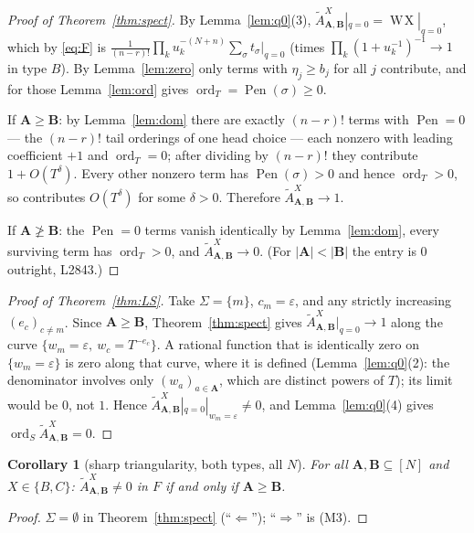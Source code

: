 \documentclass[11pt]{article}
\theoremstyle{plain}
\newtheorem{cor}[thm]{Corollary}
\theoremstyle{definition}
\newcommand{\At}{\widetilde{A}}
\newcommand{\bA}{\mathbf{A}}
\newcommand{\bB}{\mathbf{B}}
\newcommand{\ord}{\operatorname{ord}}
\newcommand{\Pen}{\operatorname{Pen}}
\DeclareMathOperator{\WX}{W\!X}
\begin{document}
\begin{proof}[Proof of Theorem~\ref{thm:spect}]
By Lemma~\ref{lem:q0}(3), $\At^{X}_{\bA,\bB}|_{q=0}=\WX|_{q=0}$, which by
\eqref{eq:F} is $\frac{1}{(n-r)!}\prod_k u_k^{-(N+n)}\sum_\sigma t_\sigma|_{q=0}$
(times $\prod_k(1+u_k^{-1})^{-1}\to1$ in type $B$).  By Lemma~\ref{lem:zero} only
terms with $\eta_j\ge b_j$ for all $j$ contribute, and for those
Lemma~\ref{lem:ord} gives $\ord_T=\Pen(\sigma)\ge0$.

If $\bA\ge\bB$: by Lemma~\ref{lem:dom} there are exactly $(n-r)!$ terms with
$\Pen=0$ --- the $(n-r)!$ tail orderings of one head choice --- each nonzero with
leading coefficient $+1$ and $\ord_T=0$; after dividing by $(n-r)!$ they
contribute $1+O(T^{\delta})$.  Every other nonzero term has $\Pen(\sigma)>0$ and
hence $\ord_T>0$, so contributes $O(T^{\delta})$ for some $\delta>0$.  Therefore
$\At^{X}_{\bA,\bB}\to1$.

If $\bA\not\ge\bB$: the $\Pen=0$ terms vanish identically by
Lemma~\ref{lem:dom}, every surviving term has $\ord_T>0$, and
$\At^{X}_{\bA,\bB}\to0$.  (For $|\bA|<|\bB|$ the entry is $0$ outright, L2843.)
\end{proof}

\begin{proof}[Proof of Theorem~\ref{thm:LS}]
Take $\Sigma=\{m\}$, $c_m=\varepsilon$, and any strictly increasing
$(e_c)_{c\ne m}$.  Since $\bA\ge\bB$, Theorem~\ref{thm:spect} gives
$\At^{X}_{\bA,\bB}|_{q=0}\to1$ along the curve
$\{w_m=\varepsilon,\ w_c=T^{-e_c}\}$.  A rational function that is identically
zero on $\{w_m=\varepsilon\}$ is zero along that curve, where it is defined
(Lemma~\ref{lem:q0}(2): the denominator involves only $(w_a)_{a\in\bA}$, which are
distinct powers of $T$); its limit would be $0$, not $1$.  Hence
$\At^{X}_{\bA,\bB}|_{q=0}|_{w_m=\varepsilon}\ne0$, and
Lemma~\ref{lem:q0}(4) gives $\ord_S\At^{X}_{\bA,\bB}=0$.
\end{proof}

\begin{cor}[sharp triangularity, both types, all $N$]\label{cor:sharp}
For all $\bA,\bB\subseteq[N]$ and $X\in\{B,C\}$:
$\At^{X}_{\bA,\bB}\ne0$ in $F$ if and only if $\bA\ge\bB$.
\end{cor}
\begin{proof}
$\Sigma=\emptyset$ in Theorem~\ref{thm:spect} (``$\Leftarrow$''); ``$\Rightarrow$''
is (M3).
\end{proof}
\end{document}
